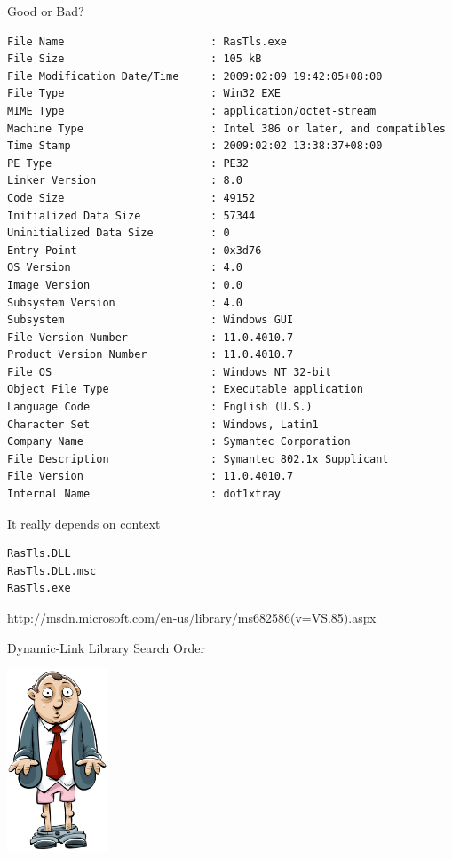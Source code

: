 \documentclass[presentation,smaller]{beamer}
\begin{document}
\begin{frame}[fragile,label=sec-6-3]{Good or Bad?}
 \tiny
\lstset{language=sh,numbers=none}
\begin{lstlisting}
File Name                       : RasTls.exe
File Size                       : 105 kB
File Modification Date/Time     : 2009:02:09 19:42:05+08:00
File Type                       : Win32 EXE
MIME Type                       : application/octet-stream
Machine Type                    : Intel 386 or later, and compatibles
Time Stamp                      : 2009:02:02 13:38:37+08:00
PE Type                         : PE32
Linker Version                  : 8.0
Code Size                       : 49152
Initialized Data Size           : 57344
Uninitialized Data Size         : 0
Entry Point                     : 0x3d76
OS Version                      : 4.0
Image Version                   : 0.0
Subsystem Version               : 4.0
Subsystem                       : Windows GUI
File Version Number             : 11.0.4010.7
Product Version Number          : 11.0.4010.7
File OS                         : Windows NT 32-bit
Object File Type                : Executable application
Language Code                   : English (U.S.)
Character Set                   : Windows, Latin1
Company Name                    : Symantec Corporation
File Description                : Symantec 802.1x Supplicant
File Version                    : 11.0.4010.7
Internal Name                   : dot1xtray
\end{lstlisting}
\normalsize
\end{frame}
\begin{frame}[fragile,label=sec-6-4]{It really depends on context}
 \lstset{language=sh,numbers=none}
\begin{lstlisting}
RasTls.DLL 
RasTls.DLL.msc
RasTls.exe
\end{lstlisting}

\url{http://msdn.microsoft.com/en-us/library/ms682586(v=VS.85).aspx}

\alert{Dynamic-Link Library Search Order}

\includegraphics[width=3cm]{images/pantsdown.jpg}
\end{frame}
\end{document}
